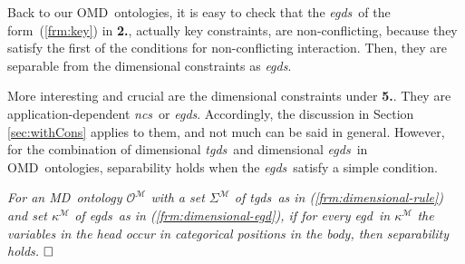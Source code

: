 \documentclass[format=acmsmall, review=false, screen=true]{acmart}
\newcommand{\ignore}[1]{}
\newcommand{\boxtheorem}{\ensuremath{\hfill \Box}}
\newcommand{\mc}[1]{\mathcal{ #1}}
\newcommand{\dpm}{{Datalog}$^\pm$}
\newcommand{\omd}{OMD}
\newcommand{\md}{MD}
\newcommand{\egds}{{\em egds}}
\newcommand{\egd}{{\em egd}}
\newcommand{\tgds}{{\em tgds}}
\newcommand{\ncs}{{\em ncs}}
\newcommand{\red}[1]{{#1}}
\newcommand{\blue}[1]{{#1}}
\newcommand{\comlb}[1]{{\vspace{2mm}\noindent \bf \blue{COMM(LEO):}}~ #1 \hfill {\bf
    END.}\\}
\newcommand{\commos}[1]{{\vspace{2mm}\noindent \bf \blue{COMM(MOSTAFA):}}~ #1 \hfill {\bf
    END.}\\}
\begin{document}
\ignore{In our MD ontologies we may have three kinds of constraints, those  in Section \ref{sec:omd}, under {\bf 1.}-{\bf 3.}, and  {\bf 5.}.}

\ignore{
\comlb{I remember there is a paper where constraints with negation as those we have were allowed. If I remember correctly, they can be treated as negative constraints with conjunctive bodies. Right? Was it in the early paper with Kifer, one with stratified negation in constraints and tgds. You remember? It would be good to say something here less ad hoc, and more general.}
\commos{The kind of negation we have is stratified that has been discussed and supported from the early \dpm \ papers~\cite{cali09,cali10}.}
}

Back to our \omd \ ontologies, it is easy to check that the \egds \ of the form~(\ref{frm:key}) in {\bf 2.}, actually key constraints, are non-conflicting,  because they satisfy the first of the conditions for non-conflicting interaction. Then, they are  separable
from the dimensional constraints as \egds.

More interesting and crucial are the dimensional constraints under {\bf 5.}. They are application-dependent \ncs \ or \egds. Accordingly, the discussion in Section \ref{sec:withCons} applies to them, and not much can be said in general. However,  for the combination of dimensional \tgds \ and dimensional \egds \ in \omd \ ontologies, separability holds when the \egds \ satisfy a simple condition.

\ignore{\comlb{Below is stated in terms of egds. Check.}
\commos{I checked and it is fine.}
\comlb{\red{NEW}: You mean you get separability without going through non-conflictingness (which we do not have for general egds)? If right, the last line in red of the previous paragraph is wrong: it is not done via non-interaction.}  }

\begin{proposition}\label{prop:sep}\em For an \md \ ontology $\mc{O}^\mc{M}$ with a set $\Sigma^\mc{M}$ of \tgds \ as in (\ref{frm:dimensional-rule}) and set $\kappa^\mc{M}$ of \egds \ as in (\ref{frm:dimensional-egd}), if for every \egd \ in $\kappa^\mc{M}$ the variables in the  head occur in categorical positions in the body, then separability holds. \boxtheorem\end{proposition}
\end{document}
